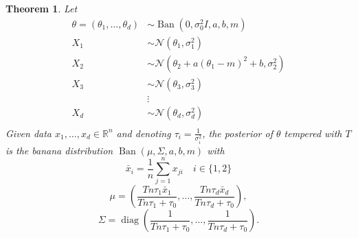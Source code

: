 \documentclass[english,twoside,openright]{HYgraduMLDS}
\newtheorem{theorem}{Theorem}
\newcommand{\R}{\mathbb{R}}
\newcommand{\caln}{{\mathcal{N}}}
\DeclareMathOperator{\ban}{Ban}
\DeclareMathOperator{\diag}{diag}
\begin{document}
\begin{theorem}\label{banana_posterior_theorem}
    Let
    \begin{align*}
        \theta = (\theta_1,\dotsc, \theta_d) &\sim
        \ban(0, \sigma_0^2I, a, b, m) \\
        X_1 &\sim \caln(\theta_1, \sigma_1^2) \\
        X_2 &\sim \caln(\theta_2 + a(\theta_1 - m)^2 + b, \sigma_2^2)\\
        X_3 &\sim \caln(\theta_3, \sigma_3^2) \\
            &\vdots \\
        X_d &\sim \caln(\theta_d, \sigma_d^2) \\
    \end{align*}
    Given data \(x_1,\dotsc, x_d\in \R^n\) and
    denoting \(\tau_i = \frac{1}{\sigma_i^2}\),
    the posterior of \(\theta\) tempered with \(T\) is the banana distribution
    \(\ban(\mu, \Sigma, a, b, m)\)
    with
    \[
        \bar{x}_i = \frac{1}{n}\sum_{j=1}^n x_{ji} \quad i\in \{1, 2\}
    \]
    \[
        \mu = \left(\frac{Tn\tau_1\bar{x}_1}{Tn\tau_1 + \tau_0},\dotsc,
        \frac{Tn\tau_d\bar{x}_d}{Tn\tau_d + \tau_0}\right),
    \]
    \[
        \Sigma = \diag\left(
            \frac{1}{Tn\tau_1 + \tau_0},\dotsc,
            \frac{1}{Tn\tau_d + \tau_0}
        \right).
    \]
\end{theorem}
\end{document}
